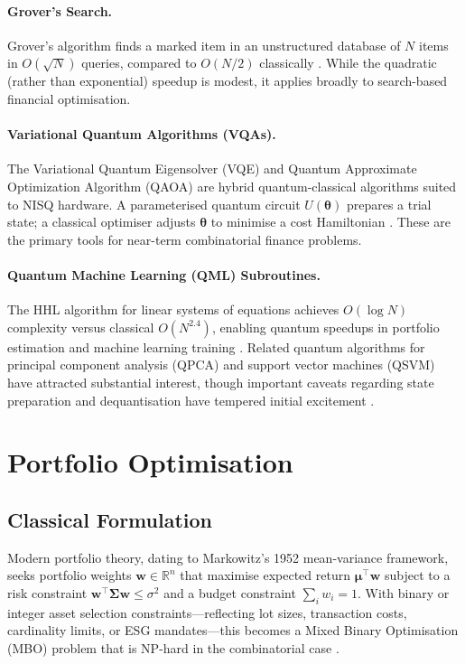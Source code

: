 \documentclass[12pt,a4paper]{article}
\begin{document}
\paragraph{Grover's Search.}
Grover's algorithm finds a marked item in an unstructured database of $N$ items in $O(\sqrt{N})$ queries, compared to $O(N/2)$ classically \citep{orus_quantum_2019}. While the quadratic (rather than exponential) speedup is modest, it applies broadly to search-based financial optimisation.

\paragraph{Variational Quantum Algorithms (VQAs).}
The Variational Quantum Eigensolver (VQE) and Quantum Approximate Optimization Algorithm (QAOA) are hybrid quantum-classical algorithms suited to NISQ hardware. A parameterised quantum circuit $U(\boldsymbol{\theta})$ prepares a trial state; a classical optimiser adjusts $\boldsymbol{\theta}$ to minimise a cost Hamiltonian \citep{egger_quantum_2020, zaman_po-qa_2024}. These are the primary tools for near-term combinatorial finance problems.

\paragraph{Quantum Machine Learning (QML) Subroutines.}
The HHL algorithm for linear systems of equations achieves $O(\log N)$ complexity versus classical $O(N^{2.4})$, enabling quantum speedups in portfolio estimation and machine learning training \citep{biamonte_quantum_2017}. Related quantum algorithms for principal component analysis (QPCA) and support vector machines (QSVM) have attracted substantial interest, though important caveats regarding state preparation and dequantisation have tempered initial excitement \citep{herman_quantum_2023}.

\section{Portfolio Optimisation}
\label{sec:portfolio}

\subsection{Classical Formulation}

Modern portfolio theory, dating to Markowitz's 1952 mean-variance framework, seeks portfolio weights $\mathbf{w} \in \mathbb{R}^n$ that maximise expected return $\boldsymbol{\mu}^\top \mathbf{w}$ subject to a risk constraint $\mathbf{w}^\top \boldsymbol{\Sigma} \mathbf{w} \leq \sigma^2$ and a budget constraint $\sum_i w_i = 1$. With binary or integer asset selection constraints---reflecting lot sizes, transaction costs, cardinality limits, or ESG mandates---this becomes a Mixed Binary Optimisation (MBO) problem that is NP-hard in the combinatorial case \citep{orus_quantum_2019, egger_quantum_2020}.
\end{document}

